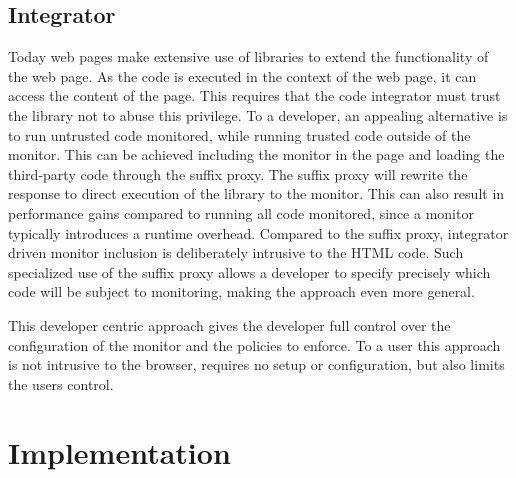 \documentclass{llncs}
\begin{document}
\subsection{Integrator}


Today web pages make extensive use of libraries to extend the functionality of 
the web page. As the code is executed in the context of the web page, it can 
access the content of the page. This requires that the code integrator must 
trust the library not to abuse this privilege. To a developer, an appealing alternative 
is to run untrusted code monitored, while running trusted code outside of the 
monitor. This can be achieved including the monitor in the page and loading the 
third-party code through the suffix proxy. The suffix proxy will rewrite the 
response to direct execution of the library to the monitor. This can also result in performance 
gains compared to running all code monitored, since a monitor typically introduces 
a runtime overhead. Compared to the suffix proxy, integrator driven monitor 
inclusion is deliberately intrusive to the HTML code. Such specialized use of the suffix 
proxy allows a developer to specify precisely which code will be subject to 
monitoring, making the approach even more general. 

This developer centric approach gives the developer full control over the 
configuration of the monitor and the policies to enforce. To a user this 
approach is not intrusive to the browser, requires no setup or configuration, 
but also limits the users control. 


\section{Implementation}
\label{sec:impl}
\end{document}

